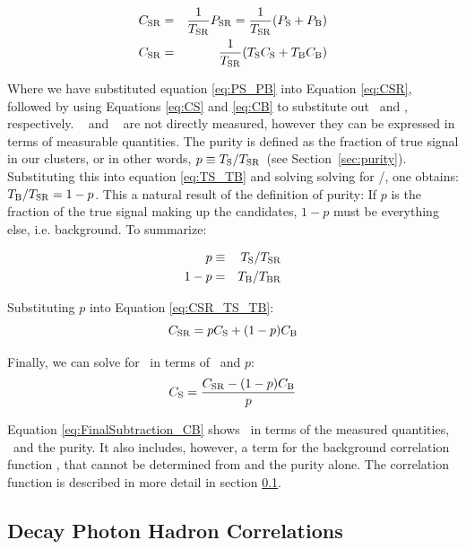 \begin{eqnarray}
\label{eq:31}
C_{\mathrm{SR}} &=& \frac{1}{T_{\mathrm{SR}}}P_{\mathrm{SR}} = \frac{1}{T_{\mathrm{SR}}}(P_{\mathrm{S}} + P_{\mathrm{B}})\\
C_{\mathrm{SR}} &=& \frac{1}{T_{\mathrm{SR}}}(T_{\mathrm{S}}C_{\mathrm{S}} +T_{\mathrm{B}}C_{\mathrm{B}})\label{eq:CSR_TS_TB}
\end{eqnarray}

Where we have substituted equation \ref{eq:PS_PB} into  Equation \ref{eq:CSR}, followed by using Equations \ref{eq:CS} and \ref{eq:CB} to substitute out \PS~and \PB, respectively. \TS~ and \TB~ are not directly measured, however they can be expressed in terms of measurable quantities. The purity is defined as the fraction of true signal in our \gammaiso clusters, or in other words, $p \equiv T_{\mathrm{S}}/T_{\mathrm{SR}}$~(see Section~\ref{sec:purity}). Substituting this into equation \ref{eq:TS_TB} and solving solving for \TB/\TSR, one obtains: $T_{\mathrm{B}}/T_{\mathrm{SR}} = 1-p$. This a natural result of the definition of purity: If $p$ is the fraction of the true signal making up the \gammaiso candidates, $1-p$ must be everything else, i.e. background. To summarize:

\begin{eqnarray}
	p &\equiv & T_{\mathrm{S}}/T_{\mathrm{SR}}\\
	1-p &=& T_{\mathrm{B}}/T_{\mathrm{BR}}
\end{eqnarray}


Substituting $p$ into Equation \ref{eq:CSR_TS_TB}:
\begin{equation}
	C_{\mathrm{SR}} = pC_{\mathrm{S}}+ (1-p)C_{\mathrm{B}} \label{eq:CSR_CS}
\end{equation}

Finally, we can solve for \CS~in terms of \CSR~and $p$:
\begin{equation}
C_{\mathrm{S}} = \frac{C_{\mathrm{SR}} - (1-p) C_{\mathrm{B}}}{p}
\label{eq:FinalSubtraction_CB}
\end{equation}


Equation \ref{eq:FinalSubtraction_CB} shows \CS~in terms of the measured quantities, \CSR~and the purity. It also includes, however, a term for the background correlation function \CB, that cannot be determined from \CSR and the purity alone. The correlation function \CB is described in more detail in section \ref{sec:cb}.

\subsection{Decay Photon Hadron Correlations}
\label{sec:cb}

